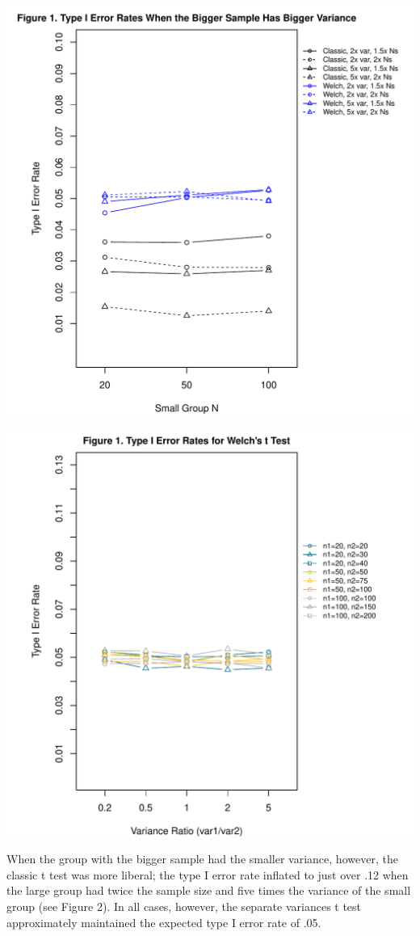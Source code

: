 \documentclass[man]{apa6}\usepackage[]{graphicx}\usepackage[]{color}
\makeatletter
\def\maxwidth{ %
  \ifdim\Gin@nat@width>\linewidth
    \linewidth
  \else
    \Gin@nat@width
  \fi
}
\newenvironment{knitrout}{}{} %
\makeatother
\begin{document}
\begin{knitrout}
\color{fgcolor}
\includegraphics[width=\maxwidth]{figure/ssv_type11} 

\includegraphics[width=\maxwidth]{figure/ssv_type12} 

\end{knitrout}
When the group with the bigger sample had the smaller variance, however, the classic t test was more liberal; the type I error rate inflated to just over .12 when the large group had twice the sample size and five times the variance of the small group (see Figure 2). In all cases, however, the separate variances t test approximately  maintained the expected type I error rate of .05.
\end{document}
